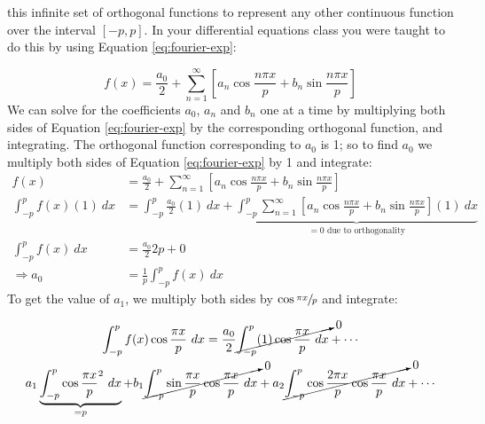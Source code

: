  this infinite set of orthogonal functions to represent any other continuous function over the interval $[-p,p]$.  In your differential equations class you were taught to do this by using Equation \ref{eq:fourier-exp}:

\begin{equation}
f(x) = \frac{a_0}{2} + \sum\limits_{n=1}^{\infty}\left[a_n \cos{\frac{n \pi x}{p}} + b_n \sin{\frac{n \pi x}{p}} \right]
\label{eq:fourier-exp}
\end{equation}
We can solve for the coefficients $a_0$, $a_n$ and $b_n$ one at a time by multiplying both sides of Equation \ref{eq:fourier-exp} by the corresponding orthogonal function, and integrating.  The orthogonal function corresponding to $a_0$ is 1; so to find $a_0$ we multiply both sides of Equation \ref{eq:fourier-exp} by 1 and integrate:
\begin{align*}
f(x) &= \frac{a_0}{2}+\sum\limits_{n=1}^{\infty} \left[a_n \cos{\frac{n \pi x}{p}} + b_n \sin{\frac{n \pi x}{p}} \right] \\
\int_{-p}^{p}f(x)(1) \ dx &= \int_{-p}^{p}\frac{a_0}{2}(1) \ dx + \underbrace{\int_{-p}^{p} \sum\limits_{n=1}^{\infty} \left[a_n \cos{\frac{n \pi x}{p}} + b_n \sin{\frac{n \pi x}{p}} \right](1) \ dx}_{= 0 \text{ due to orthogonality}} \\
\int_{-p}^{p} f(x) \ dx &= \frac{a_0}{2} 2p + 0 \\
\Rightarrow a_0 &= \frac{1}{p}\int_{-p}^{p}f(x) \ dx
\end{align*}
To get the value of $a_1$, we multiply both sides by $\cos{\sfrac{\pi x}{p}}$ and integrate:
\begin{fullwidth}
\begin{multline*}
\int_{-p}^{p} f(x)\cos{\frac{\pi x}{p}} \ dx = \frac{a_0}{2} \cancelto{0}{\int_{-p}^{p}(1)\cos{\frac{\pi x}{p}} \ dx} + \cdots \\
a_1 \underbrace{\int_{-p}^{p}\cos{\frac{\pi x}{p}}^2 \ dx}_{=p} + b_1 \cancelto{0}{\int_{-p}^{p} \sin{\frac{\pi x}{p}}\cos{\frac{\pi x}{p}} \ dx} + a_2 \cancelto{0}{\int_{-p}^{p}\cos{\frac{2\pi x}{p}}\cos{\frac{\pi x}{p}} \ dx}  + \cdots
\end{multline*}
\end{fullwidth}
